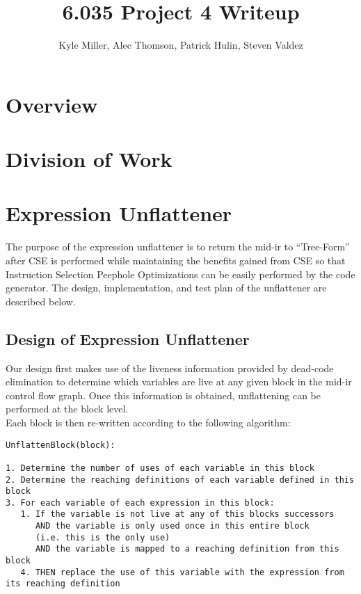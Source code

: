 \documentclass[11pt]{article}
\title{6.035 Project 4 Writeup}
\author{Kyle Miller, Alec Thomson, Patrick Hulin, Steven Valdez}
\begin{document}
\maketitle

\section {Overview}

\section {Division of Work}

\section {Expression Unflattener}

The purpose of the expression unflattener is to return the mid-ir to ``Tree-Form'' after CSE is performed while maintaining the benefits gained from CSE so that Instruction Selection Peephole Optimizations can be easily performed by the code generator. The design, implementation, and test plan of the unflattener are described below. 

\subsection{Design of Expression Unflattener}

Our design first makes use of the liveness information
provided by dead-code elimination to determine which variables are
live at any given block in the mid-ir control flow graph. Once this
information is obtained, unflattening can be performed at the block
level.\\


\noindent Each block is then re-written according to the following algorithm: 

\begin{verbatim}
UnflattenBlock(block):

1. Determine the number of uses of each variable in this block 
2. Determine the reaching definitions of each variable defined in this
block
3. For each variable of each expression in this block: 
   1. If the variable is not live at any of this blocks successors 
      AND the variable is only used once in this entire block 
      (i.e. this is the only use)
      AND the variable is mapped to a reaching definition from this block 
   4. THEN replace the use of this variable with the expression from
its reaching definition
\end{verbatim}
\end{document}
